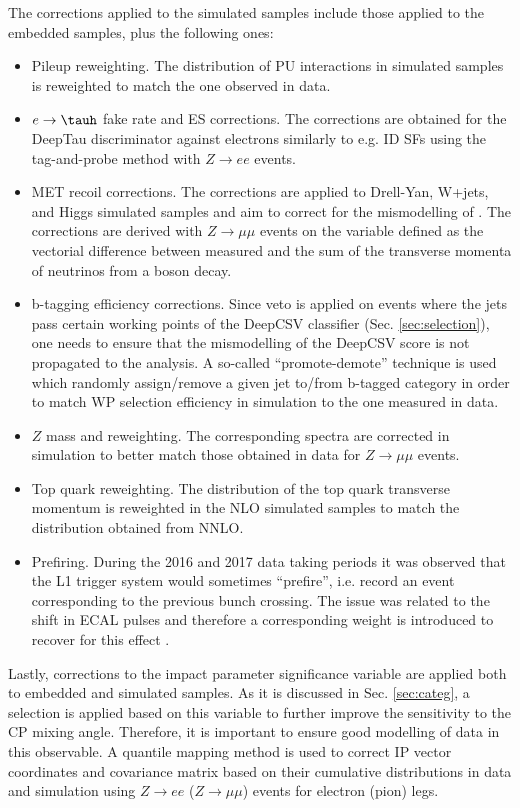 The corrections applied to the simulated samples include those applied to the embedded samples, plus the following ones:
\begin{itemize}
    \item Pileup reweighting. The distribution of PU interactions in simulated samples is reweighted to match the one observed in data.
    \item $e\to\tauh$ fake rate and ES corrections. The corrections are obtained for the DeepTau discriminator against electrons similarly to e.g. \tauh ID SFs using the tag-and-probe method with $Z\to ee$ events. 
    \item MET recoil corrections. The corrections are applied to Drell-Yan, W+jets, and Higgs simulated samples and aim to correct for the mismodelling of \met. The corrections are derived with $Z\to\mu\mu$ events on the variable defined as the vectorial difference between measured \met and the sum of the transverse momenta of neutrinos from a boson decay. 
    \item b-tagging efficiency corrections. Since veto is applied on events where the jets pass certain working points of the DeepCSV classifier (Sec. \ref{sec:selection}), one needs to ensure that the mismodelling of the DeepCSV score is not propagated to the analysis. A so-called \enquote{promote-demote} technique is used which randomly assign/remove a given jet to/from b-tagged category in order to match WP selection efficiency in simulation to the one measured in data.
    \item $Z$ mass and \pt reweighting. The corresponding spectra are corrected in simulation to better match those obtained in data for $Z\to \mu\mu$ events. 
    \item Top quark \pt reweighting. The distribution of the top quark transverse momentum is reweighted in the NLO simulated samples to match the distribution obtained from NNLO.
    \item Prefiring. During the 2016 and 2017 data taking periods it was observed that the L1 trigger system would sometimes \enquote{prefire}, i.e. record an event corresponding to the previous bunch crossing. The issue was related to the shift in ECAL pulses and therefore a corresponding weight is introduced to recover for this effect \cite{CMS:2020cmk}. 
\end{itemize}

Lastly, corrections to the impact parameter significance variable are applied both to embedded and simulated samples. As it is discussed in Sec. \ref{sec:categ}, a selection is applied based on this variable to further improve the sensitivity to the CP mixing angle. Therefore, it is important to ensure good modelling of data in this observable. A quantile mapping method is used to correct IP vector coordinates and covariance matrix based on their cumulative distributions in data and simulation using $Z\to ee$ ($Z\to \mu\mu$) events for electron (pion) legs.  

